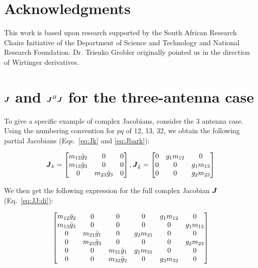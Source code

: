 \documentclass[useAMS,usenatbib]{mn2e}
\makeatletter
\newcommand{\mat}[1]{{\bmath{#1}}}
\newcommand{\JJ}{\mat{J}} %
\newcommand{\Matrix}[2]{\left [ \begin{array}{@{}#1@{}}#2\end{array} \right ]}
\makeatother
\begin{document}
\section*{Acknowledgments}

This work is based upon research supported by the South African Research Chairs Initiative of the Department of 
Science and Technology and National Research Foundation. Dr. Trienko Grobler originally pointed us in the direction
of Wirtinger derivatives.




\appendix

\section{$\JJ$ and $\JJ^H\JJ$ for the three-antenna case}
\label{sec:3ant}

To give a specific example of complex Jacobians, consider the 3 antenna case.
Using the numbering convention for $pq$ of 12, 13, 32, we obtain the following partial Jacobians
(Eqs.~\ref{eq:Jk} and \ref{eq:Jbark}):

\[
\JJ_k = \Matrix{ccc}{m_{12}\bar{g}_2 & 0 & 0 \\ m_{13}\bar{g}_3 & 0 & 0 \\ 0 & m_{23}\bar{g}_3 & 0 },
\JJ_{\bar{k}} = \Matrix{ccc}{0 & g_1 m_{12} & 0 \\ 0 & 0 & g_1 m_{13} \\ 0 & 0 & g_2 m_{23} }
\]

We then get the following expression
for the full complex Jacobian $\JJ$ (Eq.~\ref{eq:JJ:di}):

\begin{equation}
\label{eq:JJ:3ant}
\Matrix{cccccc}{
  m_{12}\bar{g}_2 & 0               & 0 &  0          & g_1 m_{12} & 0           \\
  m_{13}\bar{g}_3 & 0               & 0 &  0          & 0          & g_1 m_{13}  \\
  0               & m_{21}\bar{g}_1 & 0 &  g_2 m_{21} & 0          & 0  \\
  0               & m_{23}\bar{g}_3 & 0 &  0          & 0          & g_2 m_{23} \\
  0               & 0               & m_{31}\bar{g}_1 & g_1 m_{31} & 0          & 0  \\
  0               & 0               & m_{32}\bar{g}_2 & 0 & g_3 m_{32} & 0 \\
}
\end{equation}
\end{document}
